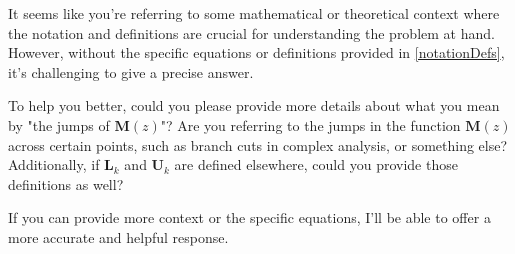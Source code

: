 It seems like you're referring to some mathematical or theoretical context where the notation and definitions are crucial for understanding the problem at hand. However, without the specific equations or definitions provided in \eqref{notationDefs}, it's challenging to give a precise answer.

To help you better, could you please provide more details about what you mean by "the jumps of \(\boldsymbol{M}(z)\)"? Are you referring to the jumps in the function \(\boldsymbol{M}(z)\) across certain points, such as branch cuts in complex analysis, or something else? Additionally, if \(\boldsymbol{L}_{k}\) and \(\boldsymbol{U}_k\) are defined elsewhere, could you provide those definitions as well?

If you can provide more context or the specific equations, I'll be able to offer a more accurate and helpful response.